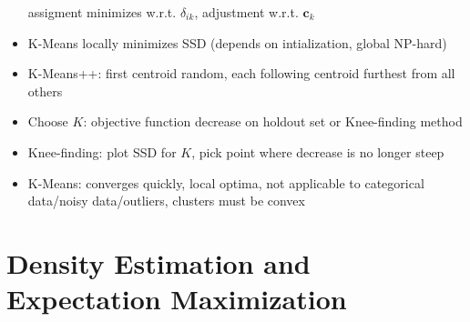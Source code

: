 \documentclass[11pt]{scrartcl}
\begin{document}
\begin{itemize}
        assigment minimizes w.r.t. \( \delta_{ik} \), adjustment w.r.t. \( \bm{c}_k \)
    \item K-Means locally minimizes SSD (depends on intialization, global NP-hard)
    \item K-Means++: first centroid random, each following centroid furthest from all others
    \item Choose \( K \): objective function decrease on holdout set or Knee-finding method
    \item Knee-finding: plot SSD for \( K \), pick point where decrease is no longer steep
    \item K-Means: converges quickly, local optima, not applicable to categorical data/noisy 
        data/outliers, clusters must be convex
\end{itemize}

\section{Density Estimation and Expectation Maximization}
\end{document}
